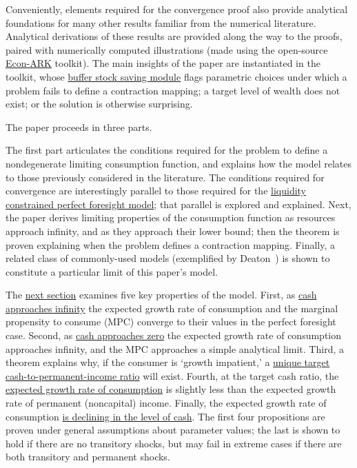 \documentclass[BufferStockTheory]{subfiles}
\begin{document}
Conveniently, elements required for the convergence proof also provide analytical foundations for many other results familiar from the numerical literature.  Analytical derivations of these results are provided along the way to the proofs, paired with numerically computed illustrations (made using the open-source \href{https://econ-ark.org}{Econ-ARK} toolkit).  The main insights of the paper are instantiated in the toolkit, whose \href{https://hark.readthedocs.io/en/stable/reference/ConsumptionSaving/ConsIndShockModel.html}{buffer stock saving module} flags parametric choices under which a problem fails to define a contraction mapping; a target level of wealth does not exist; or the solution is otherwise surprising.


The paper proceeds in three parts.

The first part articulates the conditions required for the problem to define a nondegenerate limiting consumption function, and explains how the model relates to those previously considered in the literature.  The conditions required for convergence are interestingly parallel to those required for the \hyperlink{Factors-Defined-And-Compared}{liquidity constrained perfect foresight model}; that parallel is explored and explained.  Next, the paper derives limiting properties of the consumption function as resources approach infinity, and as they approach their lower bound; then the theorem is proven explaining when the problem defines a contraction mapping.  Finally, a related class of commonly-used models (exemplified by Deaton~\citeyearpar{deatonLiqConstr}) is shown to constitute a particular limit of this paper's model.

The \hyperlink{AnalysisoftheConvergedConsumptionFunction}{next section} examines five key properties of the model. First, as \hyperlink{LimitsAsmtToInfty}{cash approaches infinity} the expected growth rate of consumption and the marginal propensity to consume (MPC) converge to their values in the perfect foresight case. Second, as \hyperlink{LimitsAsmtToZero}{cash approaches zero} the expected growth rate of consumption approaches infinity, and the MPC approaches a simple analytical limit.  Third, a theorem explains why, if the consumer is `growth impatient,' a \hyperlink{onetarget}{unique target cash-to-permanent-income ratio} will exist.  Fourth, at the target cash ratio, the \hyperlink{cGroLTpGro}{expected growth rate of consumption} is slightly less than the expected growth rate of permanent (noncapital) income.  Finally, the expected growth rate of consumption \hyperlink{dcgdxneg}{is declining in the level of cash}. The first four propositions are proven under general assumptions about parameter values; the last is shown to hold if there are no transitory shocks, but may fail in extreme cases if there are both transitory and permanent shocks.
\end{document}
